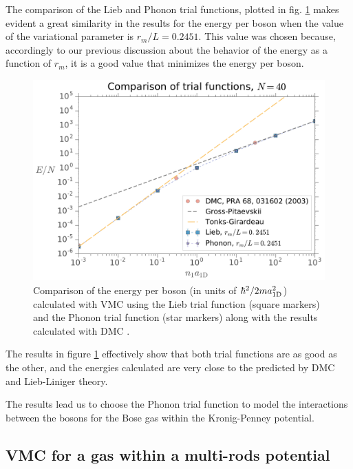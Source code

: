 The comparison of the Lieb and Phonon trial functions, plotted in fig.
\ref{fig:comparison-energy-as-n-a1d-nb-40} makes evident a great similarity in
the results for the energy per boson when the value of the variational parameter
is $r_m / L = 0.2451$. This value was chosen because, accordingly to our
previous discussion about the behavior of the energy as a function of $r_m$, it
is a good value that minimizes the energy per boson.
%
\begin{figure}[h!]
	\centering
	\includegraphics[width=0.75\linewidth]{./figures/comparison_energy-as-n-a1d_Nb-40}
	\caption{ Comparison of the energy per boson (in units of $\hbar^2 / 2 m
		a_{ \mathrm{1D} }^2$) calculated with VMC using the Lieb trial function (square
		markers) and the Phonon trial function (star markers) along with the results
		calculated with DMC \cite{bib:astrakharchik-phys-rev-a.68.031602.2003}. }
	\label{fig:comparison-energy-as-n-a1d-nb-40}
\end{figure}
%
The results in figure \ref{fig:comparison-energy-as-n-a1d-nb-40} effectively
show that both trial functions are as good as the other, and the energies
calculated are very close to the predicted by DMC and Lieb-Liniger theory.

The results  lead us to choose the Phonon trial function to model the
interactions between the bosons for the Bose gas within the Kronig-Penney
potential.



\subsection{VMC for a gas within a multi-rods potential}

